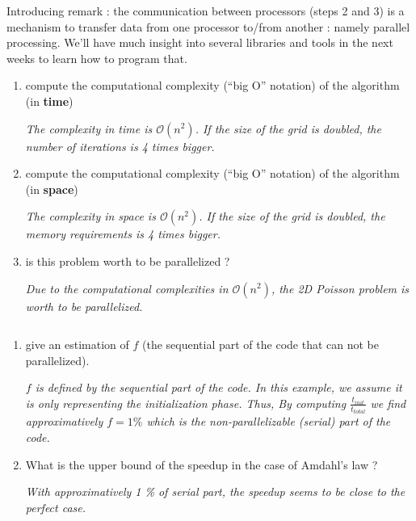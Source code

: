 \documentclass[11pt,a4paper]{article}
\begin{document}
\begin{exercise}
  $~$ %

Introducing remark : the communication between processors (steps 2 and 3) is a mechanism to transfer data from one processor to/from another : namely parallel processing. We'll have much insight into several libraries and tools in the next weeks to learn how to program that. 

\begin{enumerate}[label=(\alph*)]

	\item compute the computational complexity (``big O'' notation) of the algorithm (in {\bf time})

{\it
	The complexity in time is $\mathcal{O}(n^2)$. If the size of the grid is doubled, the number of iterations is 4 times bigger. 
}

	\item compute the computational complexity (``big O'' notation) of the algorithm (in {\bf space})

{\it
	The complexity in space is $\mathcal{O}(n^2)$. If the size of the grid is doubled, the memory requirements is 4 times bigger. 
}


	\item is this problem worth to be parallelized ?

{\it
	Due to the computational complexities in $\mathcal{O}(n^2)$, the 2D Poisson problem is worth to be parallelized. 
}


\end{enumerate}

\end{exercise}


\begin{exercise}

  $~$ %

\begin{enumerate}[label=(\alph*)]

	\item give an estimation of $f$ (the sequential part of the code that can not be parallelized). 

{\it
	$f$ is defined by the sequential part of the code. In this example, we assume it is only representing the initialization phase. Thus, By computing  $\frac{t_{init}}{t_{total}}$ we find approximatively $f = 1 \%$ which is the non-parallelizable (serial) part of the code. 
}

	\item What is the upper bound of the speedup in the case of Amdahl's law ? 

{\it
	With approximatively 1 \% of serial part, the speedup seems to be close to the perfect case. 
}	

\end{enumerate}
  

\end{exercise}
\end{document}
